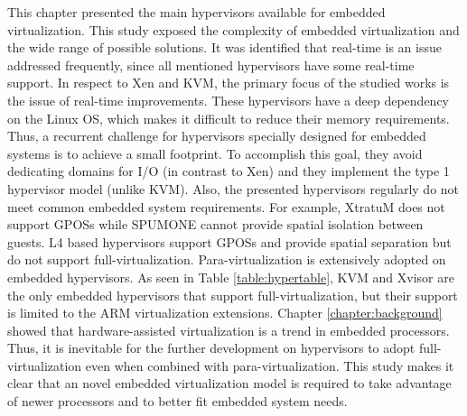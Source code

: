 This chapter presented the main hypervisors available for embedded virtualization. This study exposed the complexity of  embedded virtualization and the wide range of possible solutions. It was identified that real-time is an issue addressed frequently, since all mentioned hypervisors have some real-time support. In respect to Xen and KVM, the primary focus of the studied works is the issue of real-time improvements. These hypervisors have a deep dependency on the Linux OS, which makes it difficult to reduce their memory requirements. Thus, a recurrent challenge for hypervisors specially designed for embedded systems is to achieve a small footprint. To accomplish this goal, they avoid dedicating domains for I/O (in contrast  to Xen) and they implement the type 1 hypervisor model (unlike KVM).  Also, the presented hypervisors regularly do not meet common embedded system requirements. For example, XtratuM does not support GPOSs while SPUMONE cannot provide spatial isolation between guests. L4 based hypervisors support GPOSs and provide spatial separation but do not support full-virtualization. Para-virtualization is extensively adopted on embedded hypervisors. As seen in Table \ref{table:hypertable}, KVM and Xvisor are the only embedded hypervisors that support full-virtualization, but their support is limited to the ARM virtualization extensions. Chapter \ref{chapter:background} showed that hardware-assisted virtualization is a trend in embedded processors. Thus, it is inevitable for the further development on hypervisors to adopt full-virtualization even when combined with para-virtualization. This study makes it clear that an novel embedded virtualization model is required to take advantage of newer processors and to better fit embedded system needs.











